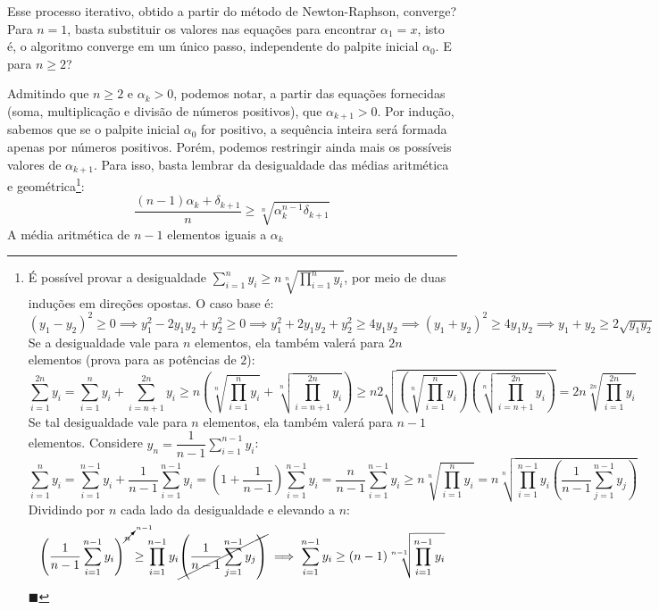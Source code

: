 \documentclass{article}
\begin{document}
Esse processo iterativo,
obtido a partir do método de Newton-Raphson,
converge?
Para $n = 1$, basta substituir os valores nas equações
para encontrar $\alpha_1 = x$,
isto é, o algoritmo converge em um único passo,
independente do palpite inicial $\alpha_0$.
E para $n \ge 2$?

Admitindo que $n \ge 2$ e $\alpha_k > 0$,
podemos notar, a partir das equações fornecidas
(soma, multiplicação e divisão de números positivos),
que $\alpha_{k+1} > 0$.
Por indução, sabemos que se o palpite inicial $\alpha_0$ for positivo,
a sequência inteira será formada apenas por números positivos.
Porém, podemos restringir ainda mais
os possíveis valores de $\alpha_{k+1}$.
Para isso, basta lembrar
da desigualdade das médias aritmética e geométrica\footnote{
  É possível provar a desigualdade
  $\sum_{i=1}^n y_i \ge n \sqrt[n]{\prod_{i=1}^n y_i}$,
  por meio de duas induções em direções opostas.
  O caso base é:
  \[
    (y_1 - y_2)^2 \ge 0
    \implies y_1^2 - 2 y_1 y_2 + y_2^2 \ge 0
    \implies y_1^2 + 2 y_1 y_2 + y_2^2 \ge 4 y_1 y_2
    \implies (y_1 + y_2)^2 \ge 4 y_1 y_2
    \implies y_1 + y_2 \ge 2 \sqrt{y_1 y_2}
  \]
  Se a desigualdade vale para $n$ elementos,
  ela também valerá para $2n$ elementos
  (prova para as potências de $2$):
  \[
    \sum_{i=1}^{2n} y_i
    = \sum_{i=1}^{n} y_i + \sum_{i=n+1}^{2n} y_i
    \ge n \left( \sqrt[n]{\prod_{i=1}^n y_i}
               + \sqrt[n]{\prod_{i=n+1}^{2n} y_i} \right)
    \ge n 2 \sqrt{ \left( \sqrt[n]{\prod_{i=1}^n y_i} \right)
                   \left( \sqrt[n]{\prod_{i=n+1}^{2n} y_i} \right) }
    = 2n \sqrt[2n]{\prod_{i=1}^{2n} y_i}
  \]
  Se tal desigualdade vale para $n$ elementos,
  ela também valerá para $n-1$ elementos.
  Considere $y_n = \dfrac{1}{n-1} \sum_{i=1}^{n-1} y_i$:
  \[
    \sum_{i=1}^{n} y_i
    = \sum_{i=1}^{n-1} y_i + \dfrac{1}{n-1} \sum_{i=1}^{n-1} y_i
    = \left( 1 + \dfrac{1}{n-1} \right) \sum_{i=1}^{n-1} y_i
    = \dfrac{n}{n-1} \sum_{i=1}^{n-1} y_i
    \ge n \sqrt[n]{\prod_{i=1}^n y_i}
    = n \sqrt[n]{\prod_{i=1}^{n-1} y_i
                 \left( \dfrac{1}{n-1} \sum_{j=1}^{n-1} y_j \right)}
  \]
  Dividindo por $n$ cada lado da desigualdade e elevando a $n$:
  \[
    \left( \dfrac{1}{n-1}
           \sum_{i=1}^{n-1} y_i \right)^{\cancelto{n-1}{n}}
    \ge \prod_{i=1}^{n-1} y_i
        \cancel{\left( \dfrac{1}{n-1} \sum_{j=1}^{n-1} y_j \right)}
    \implies
    \sum_{i=1}^{n-1} y_i \ge (n-1) \sqrt[n-1]{\prod_{i=1}^{n-1} y_i}
  \]
  \hfill$\blacksquare$
}:
\[
  \dfrac{(n-1) \alpha_k + \delta_{k+1}}{n} \ge
  \sqrt[n]{\alpha_k^{n-1} \delta_{k+1}}
\]
A média aritmética de $n-1$ elementos iguais a $\alpha_k$
\end{document}
